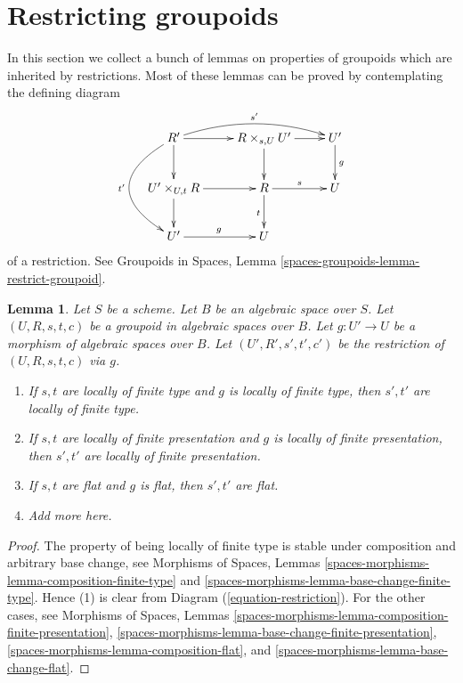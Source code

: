 \documentclass{stacks-project}
\theoremstyle{plain}
\newtheorem{lemma}[subsection]{Lemma}
\theoremstyle{definition}
\theoremstyle{remark}
\numberwithin{equation}{subsection}
\begin{document}
\section{Restricting groupoids}
\label{section-restricting-groupoids}

\noindent
In this section we collect a bunch of lemmas on
properties of groupoids which are inherited by restrictions.
Most of these lemmas can be proved by contemplating the
defining diagram
\begin{equation}
\label{equation-restriction}
\vcenter{
\xymatrix{
R' \ar[d] \ar[r] \ar@/_3pc/[dd]_{t'} \ar@/^1pc/[rr]^{s'}&
R \times_{s, U} U' \ar[r] \ar[d] &
U' \ar[d]^g \\
U' \times_{U, t} R \ar[d] \ar[r] &
R \ar[r]^s \ar[d]_t &
U \\
U' \ar[r]^g &
U
}
}
\end{equation}
of a restriction. See
Groupoids in Spaces, Lemma \ref{spaces-groupoids-lemma-restrict-groupoid}.

\begin{lemma}
\label{lemma-restrict-preserves-type}
Let $S$ be a scheme. Let $B$ be an algebraic space over $S$.
Let $(U, R, s, t, c)$ be a groupoid in algebraic spaces over $B$.
Let $g : U' \to U$ be a morphism of algebraic spaces over $B$.
Let $(U', R', s', t', c')$ be the restriction of
$(U, R, s, t, c)$ via $g$.
\begin{enumerate}
\item If $s, t$ are locally of finite type and $g$ is locally of finite
type, then $s', t'$ are locally of finite type.
\item If $s, t$ are locally of finite presentation and $g$ is locally of finite
presentation, then $s', t'$ are locally of finite presentation.
\item If $s, t$ are flat and $g$ is flat, then $s', t'$ are flat.
\item Add more here.
\end{enumerate}
\end{lemma}

\begin{proof}
The property of being locally of finite type is stable under composition
and arbitrary base change, see
Morphisms of Spaces,
Lemmas \ref{spaces-morphisms-lemma-composition-finite-type} and
\ref{spaces-morphisms-lemma-base-change-finite-type}.
Hence (1) is clear from Diagram (\ref{equation-restriction}).
For the other cases, see
Morphisms of Spaces,
Lemmas \ref{spaces-morphisms-lemma-composition-finite-presentation},
\ref{spaces-morphisms-lemma-base-change-finite-presentation},
\ref{spaces-morphisms-lemma-composition-flat}, and
\ref{spaces-morphisms-lemma-base-change-flat}.
\end{proof}
\end{document}
